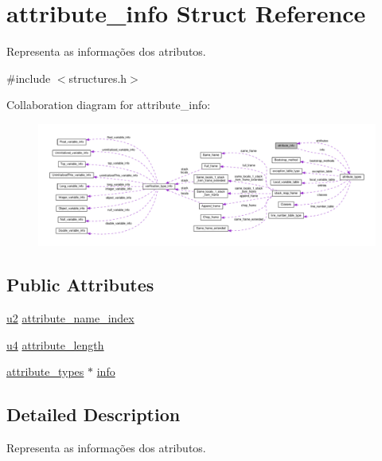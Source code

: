 \hypertarget{structattribute__info}{}\section{attribute\+\_\+info Struct Reference}
\label{structattribute__info}


Representa as informações dos atributos.  




{\ttfamily \#include $<$structures.\+h$>$}



Collaboration diagram for attribute\+\_\+info\+:
\nopagebreak
\begin{figure}[H]
\begin{center}
\leavevmode
\includegraphics[width=350pt]{structattribute__info__coll__graph}
\end{center}
\end{figure}
\subsection*{Public Attributes}
\begin{DoxyCompactItemize}
\item 
\hyperlink{structures_8h_a55ef8d87fd202b8417704c089899c5b9}{u2} \hyperlink{structattribute__info_a19df9d4b42eb55ca5dc1bed98df89378}{attribute\+\_\+name\+\_\+index}
\item 
\hyperlink{structures_8h_ae391a1d79bb0c8cbc283f0283e3c098b}{u4} \hyperlink{structattribute__info_a1ed8f679458c4bb0ed3315721588f50d}{attribute\+\_\+length}
\item 
\hyperlink{unionattribute__types}{attribute\+\_\+types} $\ast$ \hyperlink{structattribute__info_a78e740adccb41defb505248c47093958}{info}
\end{DoxyCompactItemize}


\subsection{Detailed Description}
Representa as informações dos atributos. 

